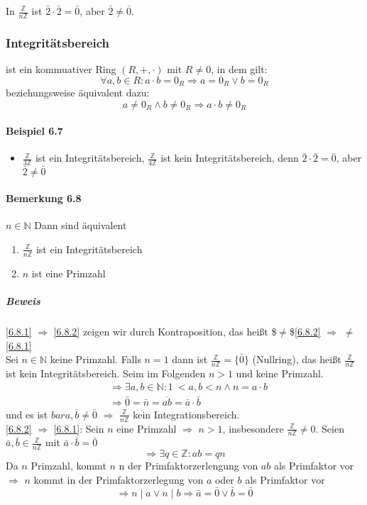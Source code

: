 \documentclass[a4paper]{scrartcl}
\DeclareMathOperator{\Forall}{\forall}
\theoremstyle{definition}
\theoremstyle{plain}
\theoremstyle{plain}
\theoremstyle{remark}
\theoremstyle{remark}
\theoremstyle{remark}
\begin{document}
In $\frac{\mathbb{Z}}{n\mathbb{Z}}$ ist $\bar 2 \cdot \bar 2 = \bar 0$, aber $\bar 2\neq \bar 0$.
\subsubsection{Integritätsbereich}
\label{sec-3-2-5}
\label{Definition-6.6}
ist ein kommuativer Ring $(R,+,\cdot)$ mit $R\neq 0$, in dem gilt:
\[\Forall a,b\in R: a\cdot b = 0_R \Rightarrow a = 0_R\vee b = 0_R\]
beziehungsweise äquivalent dazu:
\[a\neq 0_R \wedge b\neq 0_R \Rightarrow a\cdot b \neq 0_R\]
\paragraph{Beispiel 6.7}
\label{sec-3-2-5-1}
\begin{itemize}
\item $\frac{\mathbb{Z}}{3\mathbb{Z}}$ ist ein Integritätsbereich, $\frac{\mathbb{Z}}{4\mathbb{Z}}$ ist kein Integritätsbereich, denn $\bar 2\cdot \bar 2 = \bar 0$, aber $\bar 2 \neq \bar 0$
\end{itemize}
\paragraph{Bemerkung 6.8}
\label{sec-3-2-5-2}
$n\in\mathbb{N}$ Dann sind äquivalent
\begin{enumerate}
\item \label{6.8.1} $\frac{\mathbb{Z}}{n\mathbb{Z}}$ ist ein Integritätsbereich
\item \label{6.8.2} $n$ ist eine Primzahl
\end{enumerate}
\subparagraph{Beweis}
\label{sec-3-2-5-2-1}
\ref{6.8.1} $\Rightarrow$ \ref{6.8.2} zeigen wir durch Kontraposition, das heißt \$$\neq$\$\ref{6.8.2} $\Rightarrow$ $\neq$ \ref{6.8.1} \\
      Sei $n\in\mathbb{N}$ keine Primzahl. Falls $n = 1$ dann ist $\frac{\mathbb{Z}}{n\mathbb{Z}} = \{\bar 0\}$ (Nullring), das heißt $\frac{\mathbb{Z}}{n\mathbb{Z}}$ ist kein Integritätsbereich. Seim im Folgenden $n > 1$ und keine Primzahl.
\begin{align}
&\Rightarrow \exists a,b\in\mathbb{N}:1\ <a,b<n \wedge n = a\cdot b \\
&\Rightarrow \bar 0 = \bar n = \overline{a b} = \bar a \cdot \bar b
\end{align}
und es ist $bar a,\bar b\neq \bar 0$ $\Rightarrow$ $\frac{\mathbb{Z}}{n\mathbb{Z}}$ kein Integrationsbereich. \\
      \ref{6.8.2} $\Rightarrow$ \ref{6.8.1}: Sein $n$ eine Primzahl $\Rightarrow$ $n > 1$, insbesondere $\frac{\mathbb{Z}}{n\mathbb{Z}} \neq 0$. Seien $\bar a, \bar b \in \frac{\mathbb{Z}}{n\mathbb{Z}}$ mit $\bar a\cdot \bar b = \bar 0$
\[\Rightarrow \exists q\in\mathbb{Z}:a b = q n\]
Da $n$ Primzahl, kommt $n$ n der Primfaktorzerlengung von $a b$ als Primfaktor vor \\
      $\Rightarrow$ $n$ kommt in der Primfaktorzerlegung von $a$ oder $b$ als Primfaktor vor \[\Rightarrow n\mid a \vee n\mid b \Rightarrow \bar a = \bar 0 \vee \bar b = \bar 0\]
\end{document}
